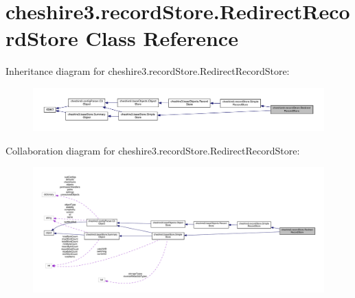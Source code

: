 \hypertarget{classcheshire3_1_1record_store_1_1_redirect_record_store}{\section{cheshire3.\-record\-Store.\-Redirect\-Record\-Store Class Reference}
\label{classcheshire3_1_1record_store_1_1_redirect_record_store}
}


Inheritance diagram for cheshire3.\-record\-Store.\-Redirect\-Record\-Store\-:
\nopagebreak
\begin{figure}[H]
\begin{center}
\leavevmode
\includegraphics[width=350pt]{classcheshire3_1_1record_store_1_1_redirect_record_store__inherit__graph}
\end{center}
\end{figure}


Collaboration diagram for cheshire3.\-record\-Store.\-Redirect\-Record\-Store\-:
\nopagebreak
\begin{figure}[H]
\begin{center}
\leavevmode
\includegraphics[width=350pt]{classcheshire3_1_1record_store_1_1_redirect_record_store__coll__graph}
\end{center}
\end{figure}
